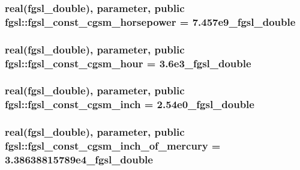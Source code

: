 \hypertarget{classfgsl_a42cd4b78f557f4774c2542bb74f48dfb}{
\subsubsection[{fgsl\-\_\-const\-\_\-cgsm\-\_\-horsepower}]{\setlength{\rightskip}{0pt plus 5cm}real({\bf fgsl\-\_\-double}), parameter, public fgsl\-::fgsl\-\_\-const\-\_\-cgsm\-\_\-horsepower = 7.\-457e9\-\_\-fgsl\-\_\-double}}\label{classfgsl_a42cd4b78f557f4774c2542bb74f48dfb}
\hypertarget{classfgsl_ae4bb30ae02c03177a710c656125616a7}{
\subsubsection[{fgsl\-\_\-const\-\_\-cgsm\-\_\-hour}]{\setlength{\rightskip}{0pt plus 5cm}real({\bf fgsl\-\_\-double}), parameter, public fgsl\-::fgsl\-\_\-const\-\_\-cgsm\-\_\-hour = 3.\-6e3\-\_\-fgsl\-\_\-double}}\label{classfgsl_ae4bb30ae02c03177a710c656125616a7}
\hypertarget{classfgsl_ad425eda5fab2505e2342ed4f46b5f5f0}{
\subsubsection[{fgsl\-\_\-const\-\_\-cgsm\-\_\-inch}]{\setlength{\rightskip}{0pt plus 5cm}real({\bf fgsl\-\_\-double}), parameter, public fgsl\-::fgsl\-\_\-const\-\_\-cgsm\-\_\-inch = 2.\-54e0\-\_\-fgsl\-\_\-double}}\label{classfgsl_ad425eda5fab2505e2342ed4f46b5f5f0}
\hypertarget{classfgsl_a3cedc29e68dc7bfeb7a43c07d1496c6e}{
\subsubsection[{fgsl\-\_\-const\-\_\-cgsm\-\_\-inch\-\_\-of\-\_\-mercury}]{\setlength{\rightskip}{0pt plus 5cm}real({\bf fgsl\-\_\-double}), parameter, public fgsl\-::fgsl\-\_\-const\-\_\-cgsm\-\_\-inch\-\_\-of\-\_\-mercury = 3.\-38638815789e4\-\_\-fgsl\-\_\-double}}\label{classfgsl_a3cedc29e68dc7bfeb7a43c07d1496c6e}
